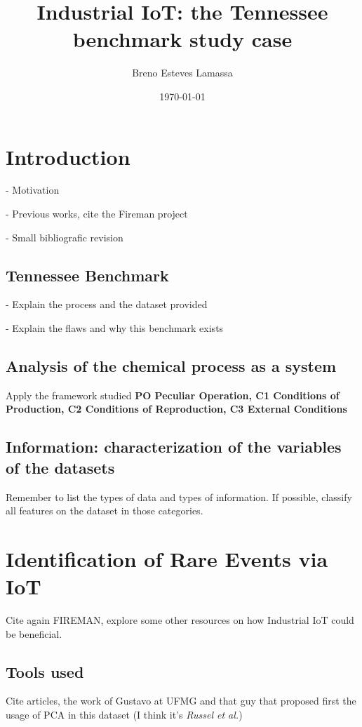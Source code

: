 \documentclass[a4paper, 12pt]{article}
\title{Industrial IoT: the Tennessee benchmark study case}
\author{Breno Esteves Lamassa}
\date{\today}
\begin{document}
\maketitle

\section{Introduction}

- Motivation

- Previous works, cite the Fireman project

- Small bibliografic revision

\subsection{Tennessee Benchmark}

- Explain the process and the dataset provided

- Explain the flaws and why this benchmark exists

\subsection{Analysis of the chemical process as a system}

Apply the framework studied \textbf{PO Peculiar Operation, C1 Conditions of Production, C2 Conditions of Reproduction, C3 External Conditions}

\subsection{Information: characterization of the variables of the datasets}

Remember to list the types of data and types of information. If possible, classify all features on the dataset in those categories.

\section{Identification of Rare Events via IoT}

Cite again FIREMAN, explore some other resources on how Industrial IoT could be beneficial.

\subsection{Tools used}
Cite articles, the work of Gustavo at UFMG and that guy that proposed first the usage of PCA in this dataset (I think it's \textit{Russel et al.})
\end{document}
